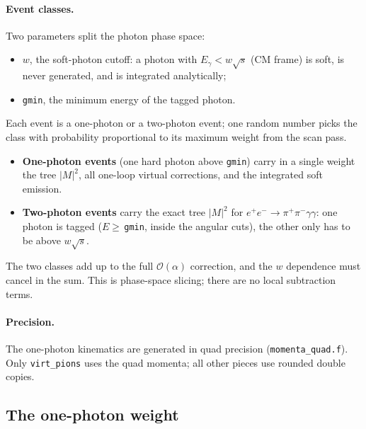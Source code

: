 \documentclass[11pt,a4paper]{article}
\newcommand{\code}[1]{\texttt{#1}}
\begin{document}
\paragraph{Event classes.} Two parameters split the photon phase space:
\begin{itemize}
\item $w$, the soft-photon cutoff: a photon with $E_\gamma<w\sqrt s$ (CM frame) is soft, is never
  generated, and is integrated analytically;
\item \code{gmin}, the minimum energy of the tagged photon.
\end{itemize}
Each event is a one-photon or a two-photon event; one random number picks the class with
probability proportional to its maximum weight from the scan pass.
\begin{itemize}
\item \textbf{One-photon events} (one hard photon above \code{gmin}) carry in a single weight the
  tree $|M|^2$, all one-loop virtual corrections, and the integrated soft emission.
\item \textbf{Two-photon events} carry the exact tree $|M|^2$ for $e^+e^-\to\pi^+\pi^-\gamma\gamma$:
  one photon is tagged ($E\ge$\,\code{gmin}, inside the angular cuts), the other only has to be
  above $w\sqrt s$.
\end{itemize}
The two classes add up to the full $\mathcal O(\alpha)$ correction, and the $w$ dependence must
cancel in the sum. This is phase-space slicing; there are no local subtraction terms.

\paragraph{Precision.} The one-photon kinematics are generated in quad precision
(\code{momenta\_quad.f}). Only \code{virt\_pions} uses the quad momenta; all other pieces use
rounded double copies.

\subsection{The one-photon weight}
\label{sec:phok-1ph}
\end{document}

